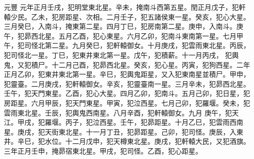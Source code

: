 \begin{pinyinscope}
 元豐
 元年正月壬戌，犯明堂東北星。辛未，掩南斗西第五星。閏正月戊子，犯軒轅少民。乙未，犯房距星、次相。二月壬子，犯五諸侯東一星。癸亥，犯心大星。三月癸巳，入南斗，掩東第二星。四月丁巳，犯房南第二星。庚申，入南斗。庚午，犯昴西北星。五月乙酉，犯心東星。六月乙卯，犯南斗東南第一星。七月甲午，犯司怪北第二星。九月癸巳，犯軒轅御女。十月庚戌，犯雲雨東北星。丙辰，犯司怪北一星。丁巳，犯東井東北第一星。戊午，犯積薪。十一月丙戌，
 犯輿鬼，又犯積尸。十二月己酉，犯昴西北星。癸亥，犯心星。丙寅，犯狗西星。二年正月乙卯，犯東井東北第一星。辛巳，犯輿鬼距星，又入犯東南星並積尸。甲申，犯靈臺。二月庚戌，犯軒轅御女。辛亥，犯靈臺南一星。三月辛未，犯昴西北星。壬午，犯天門東星。乙酉，犯心大星。四月乙卯，犯南斗。五月己卯，犯日星，犯房距星。六月甲辰，犯天門東星。甲寅，犯泣西星。七月己卯，犯羅堰。癸未，犯雲雨東北星。壬辰，犯輿鬼西南星。八月辛酉，犯軒轅御女。九月
 庚午，犯天江。甲戌，犯羅堰。丙子，犯泣西星。壬午，犯昴距星。十月乙巳，犯雲雨西南星。庚戌，犯天街東北星。十一月丁丑，犯昴距星。己卯，犯司怪。庚辰，入東井。辛巳，犯水位。十二月戊申，犯天樽東北星。庚戌，犯軒轅大民，又犯酒旗。三年正月壬申，掩昴宿東北星。甲戌，犯司怪。乙酉，犯心距星。




\end{pinyinscope}
